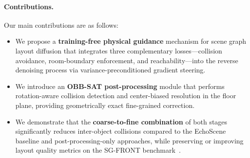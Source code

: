 \paragraph{Contributions.}
Our main contributions are as follows:

\begin{itemize}[nosep]
    \item We propose a \textbf{training-free physical guidance} mechanism for scene graph layout diffusion that integrates three complementary losses---collision avoidance, room-boundary enforcement, and reachability---into the reverse denoising process via variance-preconditioned gradient steering.

    \item We introduce an \textbf{OBB-SAT post-processing} module that performs rotation-aware collision detection and center-biased resolution in the floor plane, providing geometrically exact fine-grained correction.

    \item We demonstrate that the \textbf{coarse-to-fine combination} of both stages significantly reduces inter-object collisions compared to the EchoScene baseline and post-processing-only approaches, while preserving or improving layout quality metrics on the SG-FRONT benchmark~\cite{placeholder_sgfront}.
\end{itemize}
